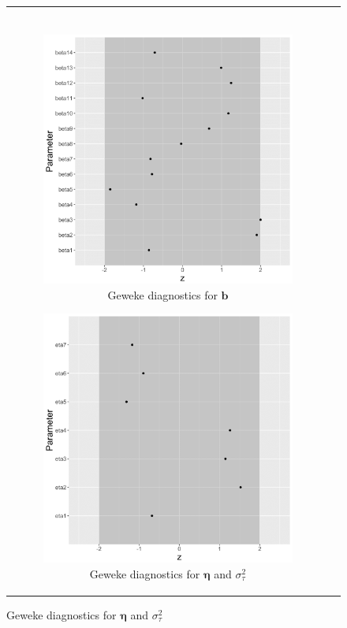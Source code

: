 \documentclass[ba]{imsart}
\numberwithin{equation}{section}
\theoremstyle{plain}
\begin{document}
\begin{figure}[H]
\begin{tabular}[t]{cc}
\begin{subfigure}[b]{0.495\textwidth}
				\end{subfigure}\\
				\begin{subfigure}[b]{0.495\textwidth}
					\caption{Geweke diagnostics for $\boldsymbol{b}$}
					\includegraphics[width=\textwidth]{img/betageweke-1.png}	
				\end{subfigure}
				\begin{subfigure}[b]{0.495\textwidth}
					\centering
					\caption{Geweke diagnostics for $\boldsymbol{\eta}$ and $\sigma^2_\tau$}
					\includegraphics[width=\textwidth]{img/etageweke-1.png}

\end{subfigure}
\end{tabular}
\end{figure}
\end{document}

